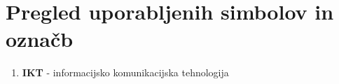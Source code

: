 
\section*{Pregled uporabljenih simbolov in označb}
\label{sec:pregled_uporabljenih_simbolov_in_označb}

\begin{enumerate}[leftmargin=*]
\item \textbf{IKT} - informacijsko komunikacijska tehnologija
\end{enumerate}




